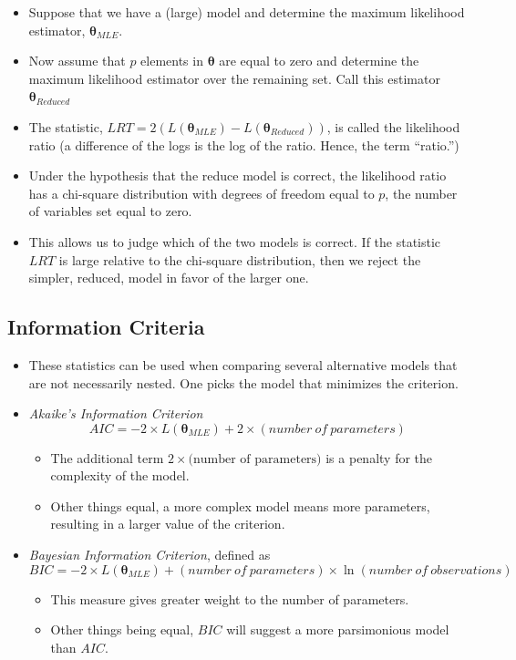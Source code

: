 \documentclass[]{book}
\theoremstyle{definition}
\theoremstyle{definition}
\theoremstyle{definition}
\theoremstyle{remark}
\begin{document}
\begin{itemize}
\item
  Suppose that we have a (large) model and determine the maximum
  likelihood estimator, \(\boldsymbol \theta_{MLE}\).
\item
  Now assume that \(p\) elements in \(\boldsymbol \theta\) are equal to
  zero and determine the maximum likelihood estimator over the remaining
  set. Call this estimator \(\boldsymbol \theta_{Reduced}\)
\item
  The statistic,
  \(LRT= 2 \left( L(\boldsymbol \theta_{MLE}) - L(\boldsymbol \theta_{Reduced}) \right)\),
  is called the likelihood ratio (a difference of the logs is the log of
  the ratio. Hence, the term ``ratio.'')
\item
  Under the hypothesis that the reduce model is correct, the likelihood
  ratio has a chi-square distribution with degrees of freedom equal to
  \(p\), the number of variables set equal to zero.
\item
  This allows us to judge which of the two models is correct. If the
  statistic \(LRT\) is large relative to the chi-square distribution,
  then we reject the simpler, reduced, model in favor of the larger one.
\end{itemize}

\subsection{Information Criteria}\label{information-criteria}

\begin{itemize}
\item
  These statistics can be used when comparing several alternative models
  that are not necessarily nested. One picks the model that minimizes
  the criterion.
\item
  \emph{Akaike's Information Criterion}
  \[AIC = -2 \times L(\boldsymbol \theta_{MLE}) + 2 \times (number~of~parameters)\]

  \begin{itemize}
  \item
    The additional term \(2 \times \text{(number of parameters)}\) is a
    penalty for the complexity of the model.
  \item
    Other things equal, a more complex model means more parameters,
    resulting in a larger value of the criterion.
  \end{itemize}
\item
  \emph{Bayesian Information Criterion}, defined as
  \[BIC = -2 \times L(\boldsymbol \theta_{MLE}) + (number~of~parameters) \times \ln (number~of~observations)\]

  \begin{itemize}
  \item
    This measure gives greater weight to the number of parameters.
  \item
    Other things being equal, \(BIC\) will suggest a more parsimonious
    model than \(AIC\).
  \end{itemize}
\end{itemize}
\end{document}
